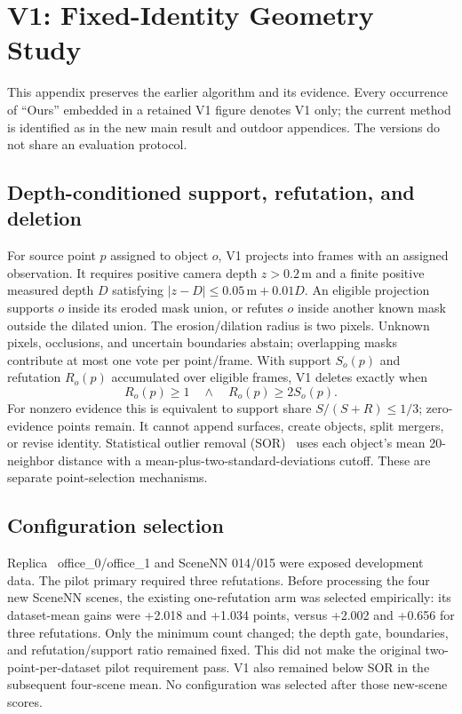 \clearpage
\section{V1: Fixed-Identity Geometry Study}\label{app:v1}
This appendix preserves the earlier algorithm and its evidence. Every occurrence of ``Ours'' embedded in a retained V1 figure denotes V1 only; the current method is identified as \ours{} in the new main result and outdoor appendices. The versions do not share an evaluation protocol.

\subsection{Depth-conditioned support, refutation, and deletion}
For source point $p$ assigned to object $o$, V1 projects into frames with an assigned observation. It requires positive camera depth $z>0.2$\,m and a finite positive measured depth $D$ satisfying $|z-D|\leq0.05\,\mathrm m+0.01D$. An eligible projection supports $o$ inside its eroded mask union, or refutes $o$ inside another known mask outside the dilated union. The erosion/dilation radius is two pixels. Unknown pixels, occlusions, and uncertain boundaries abstain; overlapping masks contribute at most one vote per point/frame. With support $S_o(p)$ and refutation $R_o(p)$ accumulated over eligible frames, V1 deletes exactly when
\begin{equation}
R_o(p)\geq1\quad\land\quad R_o(p)\geq2S_o(p).
\label{eq:v1-rule}
\end{equation}
For nonzero evidence this is equivalent to support share $S/(S+R)\leq1/3$; zero-evidence points remain. It cannot append surfaces, create objects, split mergers, or revise identity. Statistical outlier removal (SOR)~\cite{sor} uses each object's mean 20-neighbor distance with a mean-plus-two-standard-deviations cutoff. These are separate point-selection mechanisms.

\subsection{Configuration selection}
Replica~\cite{replica} office\_0/office\_1 and SceneNN 014/015 were exposed development data. The pilot primary required three refutations. Before processing the four new SceneNN scenes, the existing one-refutation arm was selected empirically: its dataset-mean gains were +2.018 and +1.034 points, versus +2.002 and +0.656 for three refutations. Only the minimum count changed; the depth gate, boundaries, and refutation/support ratio remained fixed. This did not make the original two-point-per-dataset pilot requirement pass. V1 also remained below SOR in the subsequent four-scene mean. No configuration was selected after those new-scene scores.

